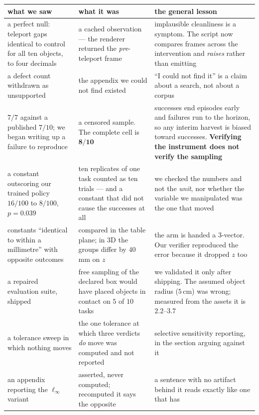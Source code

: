 \documentclass[10pt,twocolumn]{article}
\begin{document}
\begin{table}[h]\centering\footnotesize
\setlength{\tabcolsep}{3.5pt}
\begin{tabular}{p{1.75cm}p{2.2cm}p{2.95cm}}
\toprule
what we saw & what it was & the general lesson \\
\midrule
a perfect null: teleport gaps identical to control for all ten objects, to four decimals &
a cached observation --- the renderer returned the \emph{pre}-teleport frame &
implausible cleanliness is a symptom. The script now compares frames across the
intervention and \emph{raises} rather than emitting \\
\addlinespace
a defect count withdrawn as unsupported &
the appendix we could not find existed &
``I could not find it'' is a claim about a search, not about a corpus \\
\addlinespace
$7/7$ against a published $7/10$; we began writing up a failure to reproduce &
a censored sample. The complete cell is $\mathbf{8/10}$ &
successes end episodes early and failures run to the horizon, so any interim
harvest is biased toward successes. \textbf{Verifying the instrument does not
verify the sampling} \\
\addlinespace
a constant outscoring our trained policy $16/100$ to $8/100$, $p = 0.039$ &
ten replicates of one task counted as ten trials --- and a constant that did
not cause the successes at all &
we checked the numbers and not the \emph{unit}, nor whether the variable we
manipulated was the one that moved \\
\addlinespace
constants ``identical to within a millimetre'' with opposite outcomes &
compared in the table plane; in $3$D the groups differ by $40$\,mm on $z$ &
the arm is handed a $3$-vector. Our verifier reproduced the error because it
dropped $z$ too \\
\addlinespace
a repaired evaluation suite, shipped &
free sampling of the declared box would have placed objects in contact on
$5$ of $10$ tasks &
we validated it only after shipping. The assumed object radius ($5$\,cm) was
wrong; measured from the assets it is $2.2$--$3.7$ \\
\addlinespace
a tolerance sweep in which nothing moves &
the one tolerance at which three verdicts \emph{do} move was computed and not
reported &
selective sensitivity reporting, in the section arguing against it \\
\addlinespace
an appendix reporting the $\ell_\infty$ variant &
asserted, never computed; recomputed it says the opposite &
a sentence with no artifact behind it reads exactly like one that has \\

\end{tabular}
\end{table}
\end{document}

